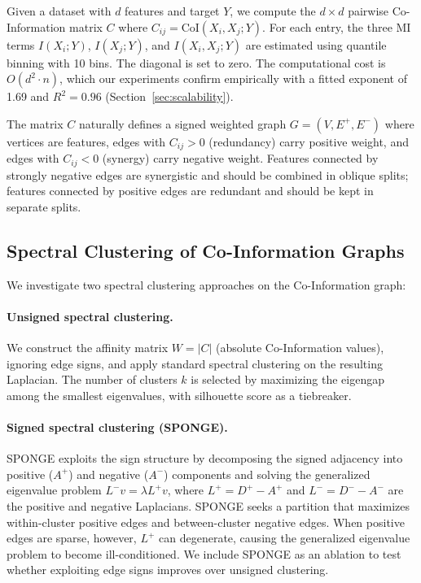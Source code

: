 \documentclass[11pt,letterpaper]{article}
\begin{document}
Given a dataset with $d$ features and target $Y$, we compute the $d \times d$ pairwise Co-Information matrix $C$ where $C_{ij} = \text{CoI}(X_i, X_j; Y)$. For each entry, the three MI terms $I(X_i; Y)$, $I(X_j; Y)$, and $I(X_i, X_j; Y)$ are estimated using quantile binning with 10 bins. The diagonal is set to zero. The computational cost is $O(d^2 \cdot n)$, which our experiments confirm empirically with a fitted exponent of 1.69 and $R^2 = 0.96$ (Section~\ref{sec:scalability}).

The matrix $C$ naturally defines a signed weighted graph $G = (V, E^+, E^-)$ where vertices are features, edges with $C_{ij} > 0$ (redundancy) carry positive weight, and edges with $C_{ij} < 0$ (synergy) carry negative weight. Features connected by strongly negative edges are synergistic and should be combined in oblique splits; features connected by positive edges are redundant and should be kept in separate splits.

\subsection{Spectral Clustering of Co-Information Graphs}
\label{sec:spectral_clustering}

We investigate two spectral clustering approaches on the Co-Information graph:

\paragraph{Unsigned spectral clustering.} We construct the affinity matrix $W = |C|$ (absolute Co-Information values), ignoring edge signs, and apply standard spectral clustering \citep{Luxburg2007} on the resulting Laplacian. The number of clusters $k$ is selected by maximizing the eigengap among the smallest eigenvalues, with silhouette score as a tiebreaker.

\paragraph{Signed spectral clustering (SPONGE).} SPONGE \citep{Cucuringu2019} exploits the sign structure by decomposing the signed adjacency into positive ($A^+$) and negative ($A^-$) components and solving the generalized eigenvalue problem $L^- v = \lambda L^+ v$, where $L^+ = D^+ - A^+$ and $L^- = D^- - A^-$ are the positive and negative Laplacians. SPONGE seeks a partition that maximizes within-cluster positive edges and between-cluster negative edges. When positive edges are sparse, however, $L^+$ can degenerate, causing the generalized eigenvalue problem to become ill-conditioned. We include SPONGE as an ablation to test whether exploiting edge signs improves over unsigned clustering.
\end{document}
